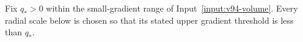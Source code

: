 

Fix $q_*>0$ within the small-gradient range of
Input~\ref{input:v94-volume}. Every radial scale below is chosen so
that its stated upper gradient threshold is less than $q_*$.
